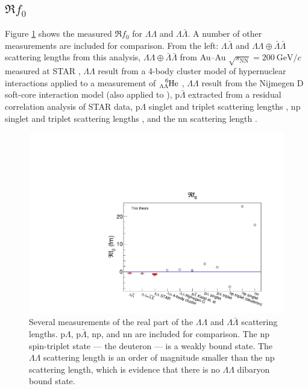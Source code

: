 


\subsection{$\Re f_0$}
\label{sec:Ref0Result}


Figure \ref{fig:Ref0} shows the measured $\Re f_0$ for $\Lambda\Lambda$ and $\Lambda\bar{\Lambda}$. A number of other measurements are included for comparison. From the left: $\Lambda\bar{\Lambda}$ and $\Lambda\Lambda \oplus \bar{\Lambda}\bar{\Lambda}$ scattering lengths from this analysis, $\Lambda\Lambda \oplus \bar{\Lambda}\bar{\Lambda}$ from Au--Au $\sqrt{s_{\mathrm{NN}}} = 200\ \mathrm{GeV}/c$ measured at STAR \cite{Adamczyk:2014vca}, $\Lambda\Lambda$ result from a 4-body cluster model of hypernuclear interactions \cite{Hiyama:2002yj} applied to a measurement of $\ce{^{6}_{\Lambda\Lambda}\mathrm{He}}$ \cite{Takahashi:2001nm}, $\Lambda\Lambda$ result from the Nijmegen D soft-core interaction model \cite{Filikhin:2002wm} (also applied to \cite{Hiyama:2002yj}), $\mathrm{p}\bar{\Lambda}$ extracted from a residual correlation analysis \cite{Kisiel:2014mma} of STAR data, $\mathrm{p}\Lambda$ singlet and triplet scattering lengths \cite{Wang:1999bf}, np singlet and triplet scattering lengths \cite{LANDAU1977502}, and the nn scattering length \cite{vonWitsch:1979uni}.

\begin{figure}[hbt]
\includegraphics[width=36pc]{Figures/FitResults/2016-10-12-Ref0.pdf}
\caption[Measurements of $\Re f_0$ for various particle pairs]{Several measurements of the real part of the $\Lambda\Lambda$ and $\Lambda\bar{\Lambda}$ scattering lengths. p$\Lambda$, p$\bar{\Lambda}$, np, and nn are included for comparison. The np spin-triplet state --- the deuteron --- is a weakly bound state. The $\Lambda\Lambda$ scattering length is an order of magnitude smaller than the np scattering length, which is evidence that there is no $\Lambda\Lambda$ dibaryon bound state.}
\label{fig:Ref0}
\end{figure}

